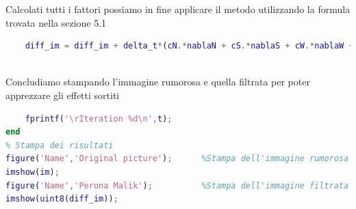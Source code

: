 Calcolati tutti i fattori possiamo in fine applicare il metodo utilizzando la formula trovata nella sezione 5.1
\begin{lstlisting}[language=MATLAB, name=listato]
    % Soluzione discreta della PDE.
    diff_im = diff_im + delta_t*(cN.*nablaN + cS.*nablaS + cW.*nablaW + cE.*nablaE );
          
\end{lstlisting}
Concludiamo stampando l'immagine rumorosa e quella filtrata per poter apprezzare gli effetti sortiti
\begin{lstlisting}[language=MATLAB, name=listato]
    % Stampa di controllo
    fprintf('\rIteration %d\n',t);
end
% Stampa dei risultati
figure('Name','Original picture');      %Stampa dell'immagine rumorosa
imshow(im);
figure('Name','Perona Malik');          %Stampa dell'immagine filtrata
imshow(uint8(diff_im));

\end{lstlisting}
